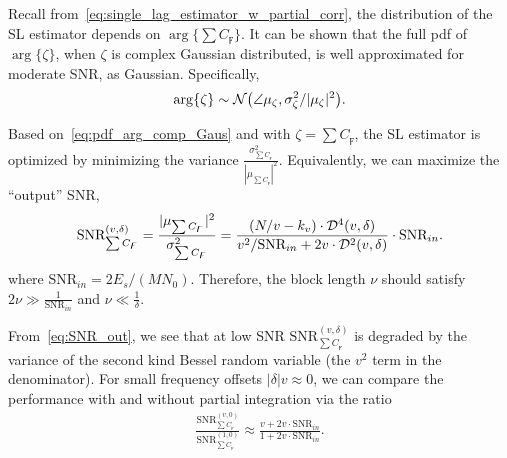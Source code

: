 Recall from~\eqref{eq:single_lag_estimator_w_partial_corr},
the distribution of the SL estimator depends on
$\arg\{\sum C_{\digamma} \}$.
It can be shown that the full pdf of $\arg\{\zeta\}$, when $\zeta$ is
complex Gaussian distributed, is well approximated for moderate SNR,
as Gaussian. 
Specifically,
\begin{equation}
  \label{eq:pdf_arg_comp_Gaus}
  \arg\{\zeta\} \sim \mathcal{N}\big(\angle \mu_{\zeta},\sigma^2_{\zeta}/|\mu_{\zeta}|^2\big).
\end{equation}

Based on~\eqref{eq:pdf_arg_comp_Gaus} and with
$\zeta = \sum C_{\digamma}$,
the SL estimator is optimized by minimizing the
variance $\frac{\sigma^2_{\sum C_{\digamma}}}{|\mu_{\sum C_{\digamma}}|^2}$.
Equivalently, we can maximize the ``output'' SNR, 
\begin{equation}
  \begin{aligned}
    \label{eq:SNR_out}
    \text{SNR}_{\sum C_{\digamma}}^{(v,\delta)}=\frac{|\mu_{\sum C_{\digamma}}|^2}{\sigma^2_{\sum C_{\digamma}}} 
    =\frac{(N/v-k_v)\cdot\mathcal{D}^4(v,\delta)}
    {v^2/\text{SNR}_{in}+2v\cdot\mathcal{D}^2(v,\delta)}\cdot\text{SNR}_{in}. \\
  \end{aligned}
\end{equation}
where $\text{SNR}_{in}=2E_s/(MN_0)$.
Therefore, the block length $\nu$ should satisfy $2\nu \gg
\frac{1
}{\text{SNR}_{in}}$ and $\nu \ll \frac{1}{\delta}$.

From~\eqref{eq:SNR_out}, we 
see that  at low SNR $\text{SNR}_{\sum C_{\digamma}}^{(v,\delta)}$ is degraded by
the variance of the second kind Bessel random variable (the $v^2$ term
in the denominator).
For small frequency offsets  $|\delta|v \approx 0$,
we can compare the performance
with and without partial integration via the ratio
\begin{equation}
  \begin{aligned}
    \label{eq:relative_processing_gain}
    \frac{\text{SNR}_{\sum C_{\digamma}}^{(v,0)}}{\text{SNR}_{\sum C_{\digamma}}^{(1,0)}}
    \approx\frac{v+2v\cdot\text{SNR}_{in}}{1+2v\cdot\text{SNR}_{in}}.
  \end{aligned}
\end{equation}

